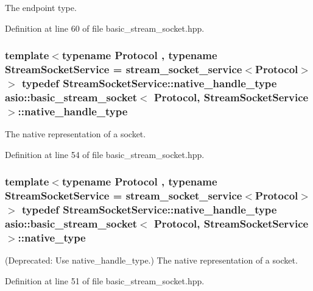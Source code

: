 The endpoint type. 



Definition at line 60 of file basic\+\_\+stream\+\_\+socket.\+hpp.

\hypertarget{classasio_1_1basic__stream__socket_a3afcab378b90959f1779a74b25e4ad1e}{}
\subsubsection[{native\+\_\+handle\+\_\+type}]{\setlength{\rightskip}{0pt plus 5cm}template$<$typename Protocol , typename Stream\+Socket\+Service  = stream\+\_\+socket\+\_\+service$<$\+Protocol$>$$>$ typedef Stream\+Socket\+Service\+::native\+\_\+handle\+\_\+type {\bf asio\+::basic\+\_\+stream\+\_\+socket}$<$ Protocol, Stream\+Socket\+Service $>$\+::{\bf native\+\_\+handle\+\_\+type}}\label{classasio_1_1basic__stream__socket_a3afcab378b90959f1779a74b25e4ad1e}


The native representation of a socket. 



Definition at line 54 of file basic\+\_\+stream\+\_\+socket.\+hpp.

\hypertarget{classasio_1_1basic__stream__socket_a0e1052ee023a793196175697720dcce2}{}
\subsubsection[{native\+\_\+type}]{\setlength{\rightskip}{0pt plus 5cm}template$<$typename Protocol , typename Stream\+Socket\+Service  = stream\+\_\+socket\+\_\+service$<$\+Protocol$>$$>$ typedef Stream\+Socket\+Service\+::native\+\_\+handle\+\_\+type {\bf asio\+::basic\+\_\+stream\+\_\+socket}$<$ Protocol, Stream\+Socket\+Service $>$\+::{\bf native\+\_\+type}}\label{classasio_1_1basic__stream__socket_a0e1052ee023a793196175697720dcce2}
(Deprecated\+: Use native\+\_\+handle\+\_\+type.) The native representation of a socket. 

Definition at line 51 of file basic\+\_\+stream\+\_\+socket.\+hpp.

